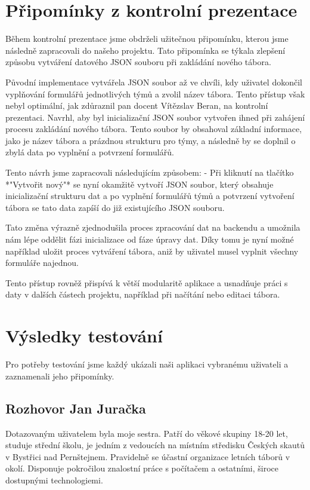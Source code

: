 \documentclass[a4paper, 12pt]{article} %
\begin{document}
\section{Připomínky z kontrolní prezentace}

Během kontrolní prezentace jsme obdrželi užitečnou připomínku, kterou jsme následně 
zapracovali do našeho projektu. Tato připomínka se týkala zlepšení způsobu vytváření datového 
JSON souboru při zakládání nového tábora. 

Původní implementace vytvářela JSON soubor až ve chvíli, kdy uživatel dokončil vyplňování 
formulářů jednotlivých týmů a zvolil název tábora. Tento přístup však nebyl optimální, jak 
zdůraznil pan docent Vítězslav Beran, na kontrolní prezentaci. Navrhl, aby byl 
inicializační JSON soubor vytvořen ihned při zahájení procesu zakládání nového tábora. 
Tento soubor by obsahoval základní informace, jako je název tábora a prázdnou strukturu 
pro týmy, a následně by se doplnil o zbylá data po vyplnění a potvrzení formulářů.

Tento návrh jsme zapracovali následujícím způsobem:
- Při kliknutí na tlačítko *"Vytvořit nový"* se nyní okamžitě vytvoří
JSON soubor, který obsahuje inicializační strukturu dat a po vyplnění formulářů týmů a 
potvrzení vytvoření tábora se tato data zapíší do již existujícího JSON souboru.

Tato změna výrazně zjednodušila proces zpracování dat na backendu a umožnila nám lépe oddělit fázi inicializace od fáze úpravy dat. Díky tomu je nyní možné například uložit proces vytváření tábora, aniž by uživatel musel vyplnit všechny formuláře najednou.

Tento přístup rovněž přispívá k větší modularitě aplikace a usnadňuje práci s daty v dalších částech projektu, například při načítání nebo editaci tábora.

\section{Výsledky testování}
Pro potřeby testování jsme každý ukázali naši aplikaci vybranému uživateli a zaznamenali jeho připomínky.

\subsection{Rozhovor Jan Juračka}
\par Dotazovaným uživatelem byla moje sestra.
Patří do věkové skupiny 18-20 let, studuje střední školu, je jedním z vedoucích na místním středisku Českých skautů v Bystřici nad Pernštejnem. Pravidelně se účastní organizace letních táborů v okolí. Disponuje pokročilou znalostní práce s počítačem a ostatními, široce dostupnými technologiemi.
\end{document}
